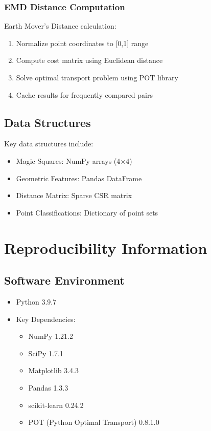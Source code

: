\documentclass[11pt]{article}
\begin{document}
\subsubsection{EMD Distance Computation}
Earth Mover's Distance calculation:
\begin{enumerate}
    \item Normalize point coordinates to [0,1] range
    \item Compute cost matrix using Euclidean distance
    \item Solve optimal transport problem using POT library
    \item Cache results for frequently compared pairs
\end{enumerate}

\subsection{Data Structures}
Key data structures include:
\begin{itemize}
    \item Magic Squares: NumPy arrays (4×4)
    \item Geometric Features: Pandas DataFrame
    \item Distance Matrix: Sparse CSR matrix
    \item Point Classifications: Dictionary of point sets
\end{itemize}

\section{Reproducibility Information}
\label{sec:reproducibility}

\subsection{Software Environment}
\begin{itemize}
    \item Python 3.9.7
    \item Key Dependencies:
    \begin{itemize}
        \item NumPy 1.21.2
        \item SciPy 1.7.1
        \item Matplotlib 3.4.3
        \item Pandas 1.3.3
        \item scikit-learn 0.24.2
        \item POT (Python Optimal Transport) 0.8.1.0
    \end{itemize}
\end{itemize}
\end{document}
